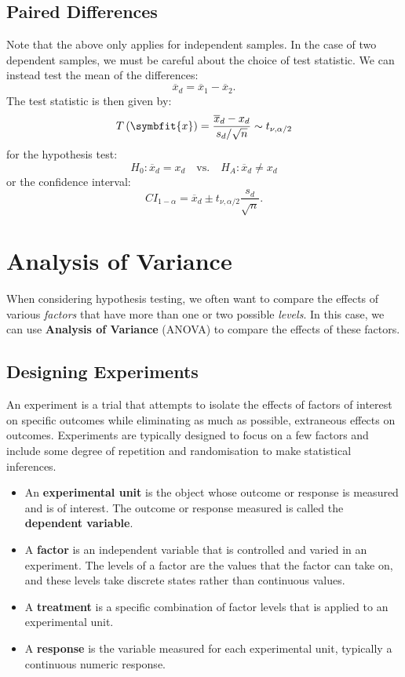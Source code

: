 \documentclass{article}
\begin{document}
\subsection{Paired Differences}
Note that the above only applies for independent samples.
In the case of two dependent samples, we must be careful about the choice
of test statistic. We can instead test the mean of the differences:
\begin{equation*}
    \overline{x}_d = \overline{x}_1 - \overline{x}_2.
\end{equation*}
The test statistic is then given by:
\begin{equation*}
    T\left( \symbfit{x} \right) = \frac{\overline{x}_d - x_d}{s_d / \sqrt{n}} \sim t_{\nu, \alpha/2}
\end{equation*}
for the hypothesis test:
\begin{equation*}
    H_0: \overline{x}_d = x_d \quad \text{vs.} \quad H_A: \overline{x}_d \neq x_d
\end{equation*}
or the confidence interval:
\begin{equation*}
    CI_{1-\alpha} = \overline{x}_d \pm t_{\nu, \alpha/2} \frac{s_d}{\sqrt{n}}.
\end{equation*}
\section{Analysis of Variance}
When considering hypothesis testing, we often want to compare the effects of various \textit{factors} that have more
than one or two possible \textit{levels}. In this case, we can use \textbf{Analysis of Variance} (ANOVA) to compare the
effects of these factors.
\subsection{Designing Experiments}
An experiment is a trial that attempts to isolate the effects of factors of interest on specific outcomes while
eliminating as much as possible, extraneous effects on outcomes. Experiments are typically designed to focus on a few factors and include
some degree of repetition and randomisation to make statistical inferences.
\begin{itemize}
    \item An \textbf{experimental unit} is the object whose outcome or response is measured and is of interest. The outcome or response measured is called the \textbf{dependent variable}.
    \item A \textbf{factor} is an independent variable that is controlled and varied in an experiment. The levels of a factor are the values that the factor can take on, and these levels take discrete states rather than continuous values.
    \item A \textbf{treatment} is a specific combination of factor levels that is applied to an experimental unit.
    \item A \textbf{response} is the variable measured for each experimental unit, typically a continuous numeric response.
\end{itemize}
\end{document}
